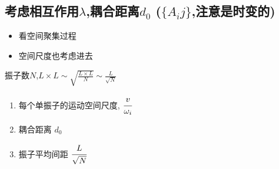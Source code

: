 \documentclass{article}
\begin{document}
\newpage






\subsection{考虑相互作用$\lambda$,耦合距离$d_0$ ($\{A_ij\}$,注意是时变的)}

\begin{itemize}
    \item 看空间聚集过程
    \item 空间尺度也考虑进去
\end{itemize}

振子数$N$,$L\times L\sim \sqrt{\frac{L\times L}{N}}\sim \frac{L}{\sqrt{N}}$

\begin{enumerate}
    \item 每个单振子的运动空间尺度, $\cfrac{v}{\omega_i}$
    \item 耦合距离 $d_0$
    \item 振子平均间距 $\cfrac{L}{\sqrt{N}}$
\end{enumerate}
\end{document}
